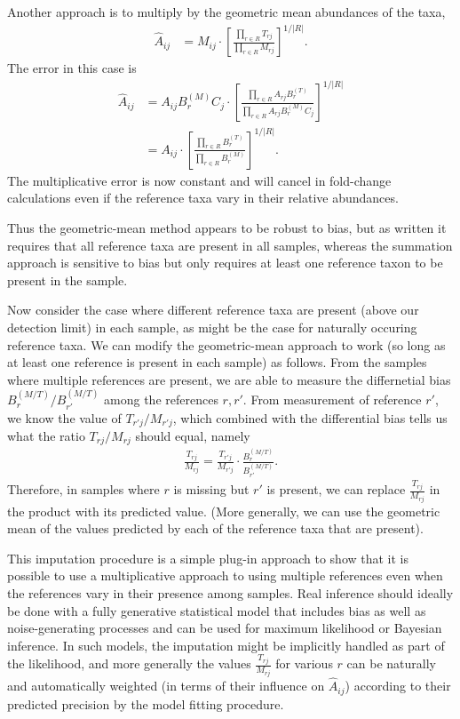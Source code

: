 \documentclass[
]{article}
\theoremstyle{definition}
\theoremstyle{definition}
\theoremstyle{definition}
\theoremstyle{definition}
\theoremstyle{remark}
\begin{document}
Another approach is to multiply by the geometric mean abundances of the taxa,
\begin{align}
  \label{eq:A-hat-targeted-prod}
  \hat A_{ij} &= M_{ij} \cdot \left[\frac{\prod_{r \in R} T_{rj}}{\prod_{r \in R} M_{rj}}\right]^{1/|R|}.
\end{align}
The error in this case is
\begin{align}
  \label{eq:error-targeted-prod}
  \hat A_{ij} 
  &= A_{ij} B^{(M)}_r C_j \cdot 
    \left[\frac{\prod_{r \in R} A_{rj} B^{(T)}_r} {\prod_{r \in R} A_{rj} B^{(M)}_r C_j} \right]^{1/|R|} \\
  &= A_{ij} \cdot 
    \left[\frac{\prod_{r \in R} B^{(T)}_r} {\prod_{r \in R} B^{(M)}_r} \right]^{1/|R|}.
\end{align}
The multiplicative error is now constant and will cancel in fold-change calculations even if the reference taxa vary in their relative abundances.

Thus the geometric-mean method appears to be robust to bias, but as written it requires that all reference taxa are present in all samples, whereas the summation approach is sensitive to bias but only requires at least one reference taxon to be present in the sample.

Now consider the case where different reference taxa are present (above our detection limit) in each sample, as might be the case for naturally occuring reference taxa.
We can modify the geometric-mean approach to work (so long as at least one reference is present in each sample) as follows.
From the samples where multiple references are present, we are able to measure the differnetial bias \(B^{(M/T)}_r / B^{(M/T)}_{r'}\) among the references \(r, r'\).
From measurement of reference \(r'\), we know the value of \(T_{r'j} / M_{r'j}\), which combined with the differential bias tells us what the ratio \(T_{rj} / M_{rj}\) should equal, namely
\begin{align}
  \frac{T_{rj}}{M_{rj}} = \frac{T_{r'j}}{M_{r'j}} \cdot \frac{B^{(M/T)}_r}{B^{(M/T)}_{r'}}.
\end{align}
Therefore, in samples where \(r\) is missing but \(r'\) is present, we can replace
\(\frac{T_{rj}}{M_{rj}}\) in the product with its predicted value.
(More generally, we can use the geometric mean of the values predicted by each of the reference taxa that are present).

This imputation procedure is a simple plug-in approach to show that it is possible to use a multiplicative approach to using multiple references even when the references vary in their presence among samples.
Real inference should ideally be done with a fully generative statistical model that includes bias as well as noise-generating processes and can be used for maximum likelihood or Bayesian inference. In such models, the imputation might be implicitly handled as part of the likelihood, and more generally the values \(\frac{T_{rj}}{M_{rj}}\) for various \(r\) can be naturally and automatically weighted (in terms of their influence on \(\hat A_{ij}\)) according to their predicted precision by the model fitting procedure.
\end{document}
